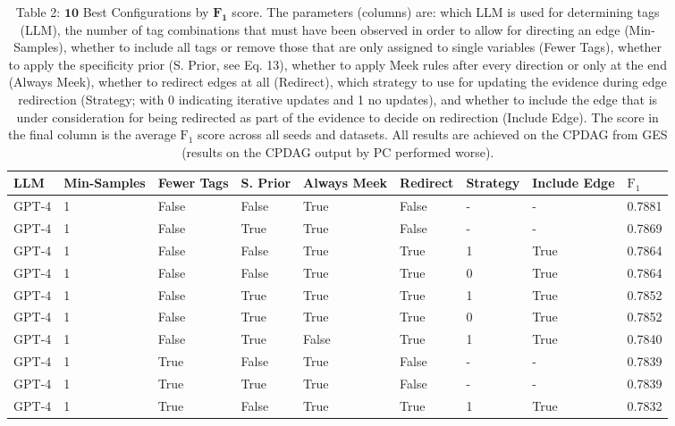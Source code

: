 \documentclass[10pt]{article}
\begin{document}
\begin{table}[h]
\begin{center}
\begin{tabular}{|l|l|l|l|l|l|l|l|l|}
\hline
LLM & Min-Samples & Fewer Tags & S. Prior & Always Meek & Redirect & Strategy & Include Edge & $\mathrm{F}_{1}$ \\
\hline
GPT-4 & 1 & False & False & True & False & - & - & 0.7881 \\
\hline
GPT-4 & 1 & False & True & True & False & - & - & 0.7869 \\
\hline
GPT-4 & 1 & False & False & True & True & 1 & True & 0.7864 \\
\hline
GPT-4 & 1 & False & False & True & True & 0 & True & 0.7864 \\
\hline
GPT-4 & 1 & False & True & True & True & 1 & True & 0.7852 \\
\hline
GPT-4 & 1 & False & True & True & True & 0 & True & 0.7852 \\
\hline
GPT-4 & 1 & False & True & False & True & 1 & True & 0.7840 \\
\hline
GPT-4 & 1 & True & False & True & False & - & - & 0.7839 \\
\hline
GPT-4 & 1 & True & True & True & False & - & - & 0.7839 \\
\hline
GPT-4 & 1 & True & False & True & True & 1 & True & 0.7832 \\
\hline
\end{tabular}
\captionsetup{labelformat=empty}
\caption{Table 2: $\mathbf{1 0}$ Best Configurations by $\mathbf{F}_{\mathbf{1}}$ score. The parameters (columns) are: which LLM is used for determining tags (LLM), the number of tag combinations that must have been observed in order to allow for directing an edge (Min-Samples), whether to include all tags or remove those that are only assigned to single variables (Fewer Tags), whether to apply the specificity prior (S. Prior, see Eq. 13), whether to apply Meek rules after every direction or only at the end (Always Meek), whether to redirect edges at all (Redirect), which strategy to use for updating the evidence during edge redirection (Strategy; with 0 indicating iterative updates and 1 no updates), and whether to include the edge that is under consideration for being redirected as part of the evidence to decide on redirection (Include Edge). The score in the final column is the average $\mathrm{F}_{1}$ score across all seeds and datasets. All results are achieved on the CPDAG from GES (results on the CPDAG output by PC performed worse).}
\end{center}
\end{table}
\end{document}
